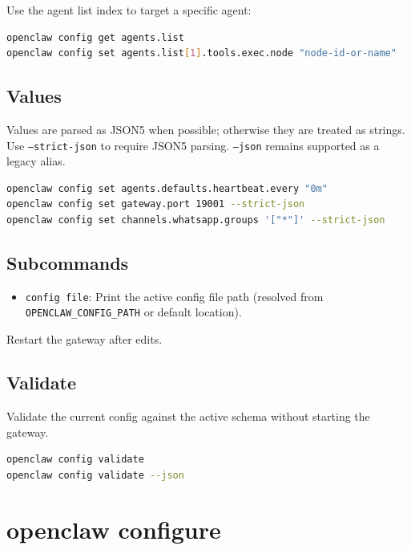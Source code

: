 Use the agent list index to target a specific agent:

\begin{lstlisting}[language=bash]
openclaw config get agents.list
openclaw config set agents.list[1].tools.exec.node "node-id-or-name"
\end{lstlisting}


\subsection{Values}


Values are parsed as JSON5 when possible; otherwise they are treated as strings.
Use \texttt{--strict-json} to require JSON5 parsing. \texttt{--json} remains supported as a legacy alias.

\begin{lstlisting}[language=bash]
openclaw config set agents.defaults.heartbeat.every "0m"
openclaw config set gateway.port 19001 --strict-json
openclaw config set channels.whatsapp.groups '["*"]' --strict-json
\end{lstlisting}


\subsection{Subcommands}


\begin{itemize}
  \item \texttt{config file}: Print the active config file path (resolved from \texttt{OPENCLAW\_CONFIG\_PATH} or default location).
\end{itemize}


Restart the gateway after edits.

\subsection{Validate}


Validate the current config against the active schema without starting the
gateway.

\begin{lstlisting}[language=bash]
openclaw config validate
openclaw config validate --json
\end{lstlisting}



\clearpage

\section{openclaw configure}


